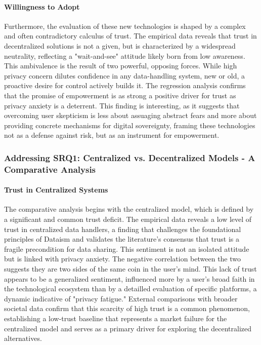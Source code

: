 	\paragraph{Willingness to Adopt}
	Furthermore, the evaluation of these new technologies is shaped by a complex and often contradictory calculus of trust. The empirical data reveals that trust in decentralized solutions is not a given, but is characterized by a widespread neutrality, reflecting a "wait-and-see" attitude likely born from low awareness. This ambivalence is the result of two powerful, opposing forces. While high privacy concern dilutes confidence in any data-handling system, new or old, a proactive desire for control actively builds it. The regression analysis confirms that the promise of empowerment is as strong a positive driver for trust as privacy anxiety is a deterrent. This finding is interesting, as it suggests that overcoming user skepticism is less about assuaging abstract fears and more about providing concrete mechanisms for digital sovereignty, framing these technologies not as a defense against risk, but as an instrument for empowerment.
	\subsubsection{Addressing SRQ1: Centralized vs. Decentralized Models - A Comparative Analysis}

	\paragraph{Trust in Centralized Systems}
	The comparative analysis begins with the centralized model, which is defined by a significant and common trust deficit. The empirical data reveals a low level of trust in centralized data handlers, a finding that challenges the foundational principles of Dataism and validates the literature's consensus that trust is a fragile precondition for data sharing. This sentiment is not an isolated attitude but is linked with privacy anxiety. The negative correlation between the two suggests they are two sides of the same coin in the user's mind. This lack of trust appears to be a generalized sentiment, influenced more by a user's broad faith in the technological ecosystem than by a detailled evaluation of specific platforms, a dynamic indicative of "privacy fatigue." External comparisons with broader societal data confirm that this scarcity of high trust is a common phenomenon, establishing a low-trust baseline that represents a market failure for the centralized model and serves as a primary driver for exploring the decentralized alternatives.

